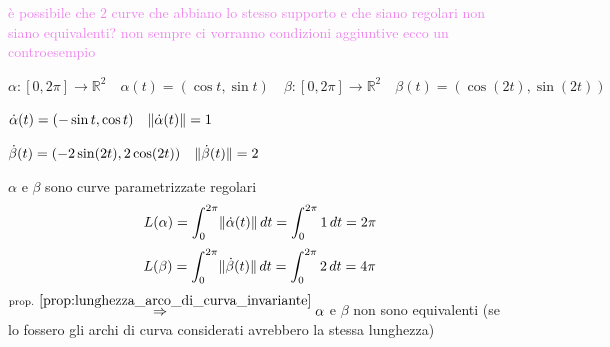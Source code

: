 \begin{esempio}
\begin{center}
        \end{center}
        \end{esempio}
        \newpage
        \begin{esempio}
        \textcolor{violet}{è possibile che $2$ curve che abbiano lo stesso supporto e che siano regolari non siano equivalenti?
        non sempre ci vorranno condizioni aggiuntive ecco un controesempio}

        $\alpha: [0,2\pi] \to \mathbb{R}^2 \quad \alpha(t) = (\cos t, \sin t) \quad \beta: [0,2\pi] \to \mathbb{R}^2 \quad \beta(t) = (\cos (2t), \sin (2t))$

        $\dot{\alpha}(t) = (-\sin t, \cos t) \quad \lVert\dot{\alpha}(t)\rVert = 1$

        $\dot{\beta}(t) = (-2\sin (2t), 2\cos (2t)) \quad \lVert\dot{\beta}(t)\rVert = 2$
        
        $\alpha$ e $\beta$ sono curve parametrizzate regolari
        \[ L(\alpha) = \int_0^{2\pi} \lVert\dot{\alpha}(t)\rVert \, dt = \int_0^{2\pi} 1 \, dt = 2\pi \]
        \[ L(\beta) = \int_0^{2\pi} \lVert\dot{\beta}(t)\rVert \, dt = \int_0^{2\pi} 2 \, dt = 4\pi \]
        $\overset{\textcolor{black}{ \text{prop. } \ref{prop:lunghezza_arco_di_curva_invariante}}}{\Rightarrow} \alpha$ e $\beta$ non sono equivalenti \textcolor{blu}{(se lo fossero gli archi di curva considerati avrebbero la stessa lunghezza)}
        \end{esempio}
        \newpage
